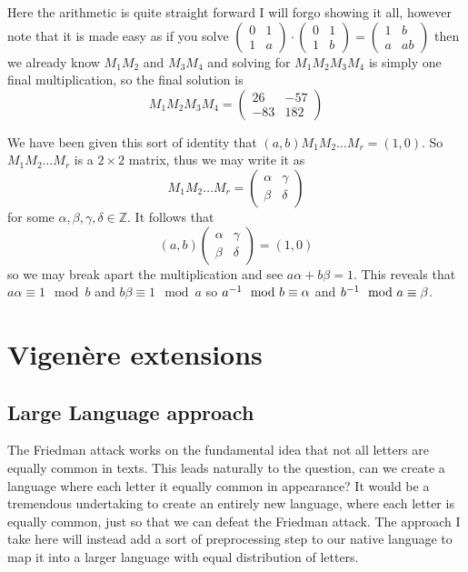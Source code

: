 \documentclass{article}
\begin{document}
	 Here the arithmetic is quite straight forward I will forgo showing it all, however note that it is made easy as if you solve $\left(\begin{matrix}0&1\\1&a\end{matrix}\right)\cdot\left(\begin{matrix}0&1\\1&b\end{matrix}\right) = \left(\begin{matrix}	1&b\\a&ab\end{matrix}\right)$ then we already know $M_1M_2$ and $M_3M_4$ and solving for $M_1M_2M_3M_4$ is simply one final multiplication, so the final solution is $$M_1M_2M_3M_4 = \left(\begin{matrix}
	26&-57\\-83&182
	\end{matrix}\right)$$
	
	 We have been given this sort of identity that $(a,b)M_1M_2\ldots M_r = (1,0)$. So $M_1M_2\ldots M_r$ is a $2\times 2$ matrix, thus we may write it as $$M_1M_2\ldots M_r=\left(\begin{matrix}
	\alpha&\gamma\\
	\beta&\delta
	\end{matrix}\right)$$ for some $\alpha,\beta,\gamma,\delta\in\mathbb Z$. It follows that $$(a,b)\left(\begin{matrix}
	\alpha&\gamma\\
	\beta&\delta
	\end{matrix}\right) = (1,0)$$ so we may break apart the multiplication and see $a\alpha+b\beta=1$. This reveals that $a\alpha \equiv 1 \mod b$ and $b\beta \equiv 1 \mod a$ so ${a}^{-1} \mod b \equiv \alpha$ and ${b}^{-1} \mod a \equiv \beta$.
	
	
	
	\section{Vigen\`ere extensions}
	\subsection{Large Language approach}
	The Friedman attack works on the fundamental idea that not all letters are equally common in texts. This leads naturally to the question, can we create a language where each letter it equally common in appearance? It would be a tremendous undertaking to create an entirely new language, where each letter is equally common, just so that we can defeat the Friedman attack. The approach I take here will instead add a sort of preprocessing step to our native language to map it into a larger language with equal distribution of letters.
	
\end{document}

